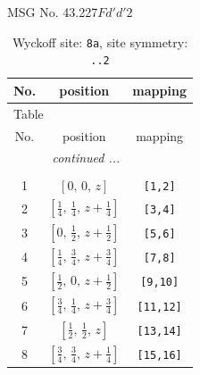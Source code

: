 \documentclass[fleqn,8pt]{jsarticle}
\begin{document}
\setcounter{MaxMatrixCols}{32}

\renewcommand{\tablename}{Table~}
\renewcommand{\figurename}{Figure~}
\begin{center}
\LARGE
MSG No. 43.227\quad$Fd'd'2$
\end{center}
\renewcommand{\arraystretch}{1.2}
\begin{longtable}{ccc}
\caption{Wyckoff site: {\tt 8a}, site symmetry: {\tt ..2}}
 \\
 \hline \hline
No. & position & mapping \\ \hline \endfirsthead

\multicolumn{2}{l}{\tablename\ \thetable{}} \\
 \hline \hline
No. & position & mapping \\ \hline \endhead

 \hline \hline
\multicolumn{2}{r}{\footnotesize\it continued ...} \\ \endfoot

 \hline \hline
\multicolumn{2}{r}{} \\ \endlastfoot

1 & $\left[ 0,\, 0,\, z \right]$ & {\tt [1,2]} \\ \hline
2 & $\left[ \frac{1}{4},\, \frac{1}{4},\, z + \frac{1}{4} \right]$ & {\tt [3,4]} \\ \hline
3 & $\left[ 0,\, \frac{1}{2},\, z + \frac{1}{2} \right]$ & {\tt [5,6]} \\ \hline
4 & $\left[ \frac{1}{4},\, \frac{3}{4},\, z + \frac{3}{4} \right]$ & {\tt [7,8]} \\ \hline
5 & $\left[ \frac{1}{2},\, 0,\, z + \frac{1}{2} \right]$ & {\tt [9,10]} \\ \hline
6 & $\left[ \frac{3}{4},\, \frac{1}{4},\, z + \frac{3}{4} \right]$ & {\tt [11,12]} \\ \hline
7 & $\left[ \frac{1}{2},\, \frac{1}{2},\, z \right]$ & {\tt [13,14]} \\ \hline
8 & $\left[ \frac{3}{4},\, \frac{3}{4},\, z + \frac{1}{4} \right]$ & {\tt [15,16]} \\
\end{longtable}
\renewcommand{\arraystretch}{1.2}
\end{document}
